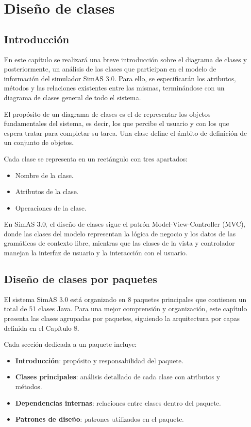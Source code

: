 \chapter{Diseño de clases} \label{cap:diseño_clases}

\section{Introducción}

En este capítulo se realizará una breve introducción sobre el diagrama de clases y posteriormente, un análisis de las clases que participan en el modelo de información del simulador SimAS 3.0. Para ello, se especificarán los atributos, métodos y las relaciones existentes entre las mismas, terminándose con un diagrama de clases general de todo el sistema.

El propósito de un diagrama de clases es el de representar los objetos fundamentales del sistema, es decir, los que percibe el usuario y con los que espera tratar para completar su tarea. Una clase define el ámbito de definición de un conjunto de objetos.

Cada clase se representa en un rectángulo con tres apartados:
\begin{itemize}
\item Nombre de la clase.
\item Atributos de la clase.
\item Operaciones de la clase.
\end{itemize}

En SimAS 3.0, el diseño de clases sigue el patrón Model-View-Controller (MVC), donde las clases del modelo representan la lógica de negocio y los datos de las gramáticas de contexto libre, mientras que las clases de la vista y controlador manejan la interfaz de usuario y la interacción con el usuario.


\section{Diseño de clases por paquetes}

El sistema SimAS 3.0 está organizado en 8 paquetes principales que contienen un total de 51 clases Java. Para una mejor comprensión y organización, este capítulo presenta las clases agrupadas por paquetes, siguiendo la arquitectura por capas definida en el Capítulo 8.

Cada sección dedicada a un paquete incluye:
\begin{itemize}
    \item \textbf{Introducción}: propósito y responsabilidad del paquete.
    \item \textbf{Clases principales}: análisis detallado de cada clase con atributos y métodos.
    \item \textbf{Dependencias internas}: relaciones entre clases dentro del paquete.
    \item \textbf{Patrones de diseño}: patrones utilizados en el paquete.
\end{itemize}

